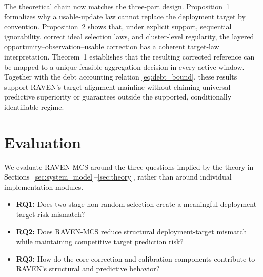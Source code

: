 \documentclass[letterpaper,journal]{IEEEtran}
\begin{document}
The theoretical chain now matches the three-part design.  Proposition~1
formalizes why a usable-update law cannot replace the deployment target by
convention.  Proposition~2 shows that, under explicit support, sequential
ignorability, correct ideal selection laws, and cluster-level regularity, the
layered opportunity--observation--usable correction has a coherent target-law
interpretation.  Theorem~1 establishes that the resulting corrected reference
can be mapped to a unique feasible aggregation decision in every active window.
Together with the debt accounting relation
\eqref{eq:debt_bound}, these results support RAVEN's target-alignment mainline
without claiming universal predictive superiority or guarantees outside the
supported, conditionally identifiable regime.



%

\section{Evaluation}
\label{sec:evaluation}

We evaluate RAVEN-MCS around the three questions implied by the theory in
Sections~\ref{sec:system_model}--\ref{sec:theory}, rather than around individual
implementation modules.

\begin{itemize}
    \item \textbf{RQ1:} Does two-stage non-random selection create a meaningful
    deployment-target risk mismatch?
    \item \textbf{RQ2:} Does RAVEN-MCS reduce structural deployment-target
    mismatch while maintaining competitive target prediction risk?
    \item \textbf{RQ3:} How do the core correction and calibration components
    contribute to RAVEN's structural and predictive behavior?
\end{itemize}
\end{document}
